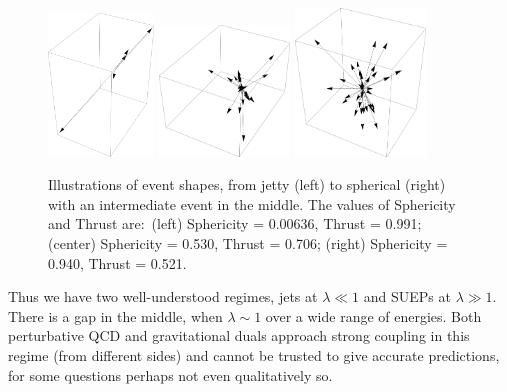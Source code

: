 \begin{figure}[t]\centering
\includegraphics[width=0.25\textwidth]{figures/DS_KKexample_event1.pdf}
\includegraphics[width=0.31\textwidth]{figures/DS_KKexample_event2.pdf}
\includegraphics[width=0.31\textwidth]{figures/DS_KKexample_event3.pdf}
\caption{Illustrations of event shapes, from jetty (left) to spherical (right) with an intermediate event in the middle. The values of Sphericity and Thrust are:~(left) Sphericity = 0.00636, Thrust = 0.991; (center) Sphericity = 0.530, Thrust = 0.706; (right)  Sphericity = 0.940, Thrust = 0.521. \label{fig:eventshapes}}
\end{figure}


Thus we have two well-understood regimes, jets at $\lambda \ll 1$ and SUEPs at $\lambda \gg 1$. There is a gap in the middle, when $\lambda \sim 1$ over a wide range of energies. Both perturbative QCD and gravitational duals approach strong coupling in this regime (from different sides) and cannot be trusted to give accurate predictions, for some questions perhaps not even qualitatively so.

